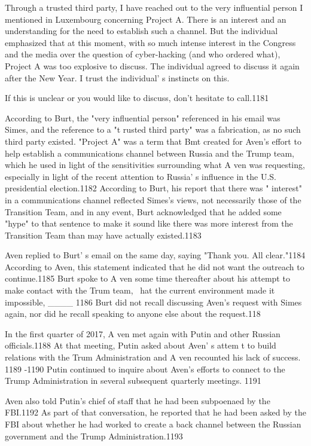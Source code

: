 Through a trusted third party, I have reached out to the very influential person I mentioned in Luxembourg concerning Project A. There is an interest and an understanding for the need to establish such a channel. But the individual emphasized that at this moment, with so much intense interest in the Congress and the media over the question of cyber-hacking (and who ordered what), Project A was too explosive to discuss. The individual agreed to discuss it again after the New Year. I trust the individual' s instincts on this.

If this is unclear or you would like to discuss, don't hesitate to call.1181

According to Burt, the "very influential person" referenced in his email was Simes,  and the reference to a "t rusted third party" was a fabrication, as no such third party existed. "Project A" was a term that Bmt created for Aven's effort to help establish a communications channel between Russia and the Trump team, which he used in light of the sensitivities surrounding what A ven was requesting, especially in light of the recent attention to Russia' s  influence in the U.S. presidential election.1182 According to Burt, his report that there was " interest"  in a communications channel reflected Simes's views, not necessarily those of the Transition Team, and in any event,  Burt acknowledged that he added some "hype" to that sentence to make it  sound like there was more interest from the Transition Team than may have actually existed.1183

Aven replied to Burt' s  email on the same day, saying "Thank you. All clear."1184 According to Aven, this statement indicated that he did not want the outreach to continue.1185 Burt spoke to A ven some time thereafter about his attempt to make  contact with the Trum team, ~hat the current environment made it impossible, ____ 1186 Burt did not recall discussing Aven's request with Simes again, nor did he recall speaking to anyone else about the request.118

In the first quarter of 2017, A ven met again with Putin and other Russian officials.1188 At that meeting, Putin asked about Aven' s attem t to build relations with the Trum Administration and A ven recounted his lack of success. 1189 -1190 Putin continued to inquire about Aven's efforts to connect to the Trump Administration in several subsequent quarterly meetings. 1191

Aven also told Putin's chief of staff that he had been subpoenaed by the FBI.1192 As part of that conversation, he reported that he had been asked by the FBI about whether he had worked to create a  back channel between  the Russian government and the Trump Administration.1193

